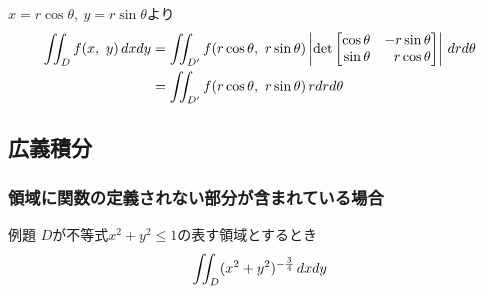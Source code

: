 $x = r\cos\theta,\ y = r\sin\theta$より
\begin{align}
	\iint_{D} f(x,\ y)\,dxdy &= \iint_{D'} f(r\cos\theta,\ r\sin\theta) \left|\det
	\begin{bmatrix*}[r]
		\cos\theta & -r\sin\theta\\ \sin\theta & r\cos\theta
	\end{bmatrix*}
	\right|\,drd\theta \notag\\
	&= \iint_{D'} f(r\cos\theta,\ r\sin\theta)\,rdrd\theta
\end{align}



\subsection{広義積分}
\subsubsection*{領域に関数の定義されない部分が含まれている場合}

\begin{tip}{例題}
	$D$が不等式$x^2 + y^2 \le 1$の表す領域とするとき
	\begin{equation*}
		\iint_{D} (x^2 + y^2)^{-\myfrac{3}{4}}\,dxdy
	\end{equation*}
\end{tip}

\newpage